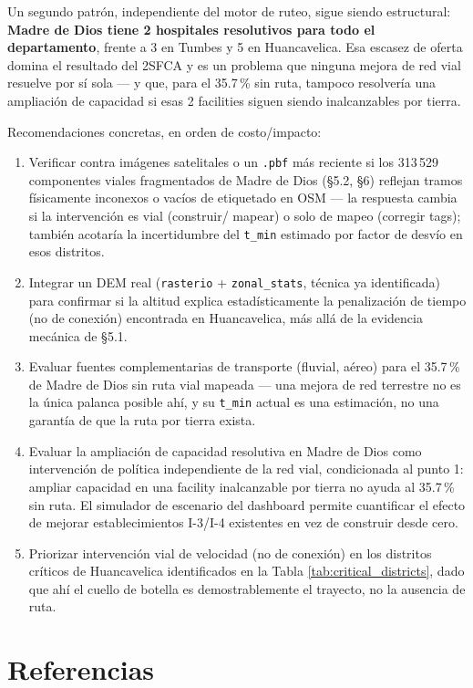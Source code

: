 \documentclass[11pt]{article}
\begin{document}
Un segundo patrón, independiente del motor de ruteo, sigue siendo
estructural: \textbf{Madre de Dios tiene 2 hospitales resolutivos para todo
el departamento}, frente a 3 en Tumbes y 5 en Huancavelica. Esa escasez de
oferta domina el resultado del 2SFCA y es un problema que ninguna mejora de
red vial resuelve por sí sola --- y que, para el 35.7\,\% sin ruta,
tampoco resolvería una ampliación de capacidad si esas 2 facilities siguen
siendo inalcanzables por tierra.

Recomendaciones concretas, en orden de costo/impacto:
\begin{enumerate}
\item Verificar contra imágenes satelitales o un \texttt{.pbf} más
  reciente si los 313\,529 componentes viales fragmentados de Madre de Dios
  (\S5.2, \S6) reflejan tramos físicamente inconexos o vacíos de etiquetado
  en OSM --- la respuesta cambia si la intervención es vial (construir/
  mapear) o solo de mapeo (corregir tags); también acotaría la
  incertidumbre del \texttt{t\_min} estimado por factor de desvío en esos
  distritos.
\item Integrar un DEM real (\texttt{rasterio} + \texttt{zonal\_stats},
  técnica ya identificada) para confirmar si la altitud explica
  estadísticamente la penalización de tiempo (no de conexión) encontrada en
  Huancavelica, más allá de la evidencia mecánica de \S5.1.
\item Evaluar fuentes complementarias de transporte (fluvial, aéreo) para
  el 35.7\,\% de Madre de Dios sin ruta vial mapeada --- una mejora de red
  terrestre no es la única palanca posible ahí, y su \texttt{t\_min} actual
  es una estimación, no una garantía de que la ruta por tierra exista.
\item Evaluar la ampliación de capacidad resolutiva en Madre de Dios como
  intervención de política independiente de la red vial, condicionada al
  punto 1: ampliar capacidad en una facility inalcanzable por tierra no
  ayuda al 35.7\,\% sin ruta. El simulador de escenario del dashboard
  permite cuantificar el efecto de mejorar establecimientos I-3/I-4
  existentes en vez de construir desde cero.
\item Priorizar intervención vial de velocidad (no de conexión) en los
  distritos críticos de Huancavelica identificados en la Tabla
  \ref{tab:critical_districts}, dado que ahí el cuello de botella es
  demostrablemente el trayecto, no la ausencia de ruta.
\end{enumerate}

\section{Referencias}
\end{document}
